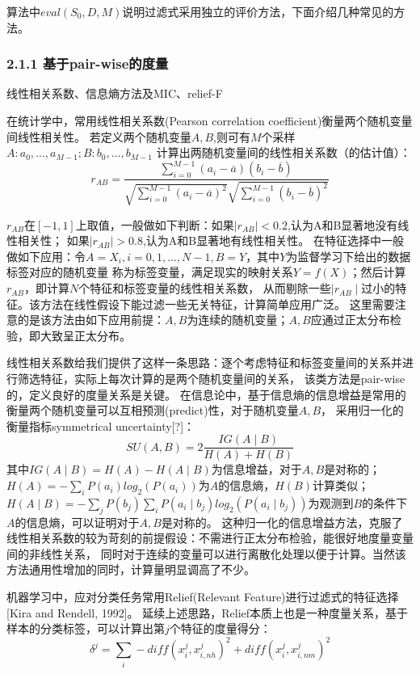 \documentclass[a4paper,UTF8]{article}
\begin{document}
  算法中$ eval(S_{0}, D, M)$说明过滤式采用独立的评价方法，下面介绍几种常见的方法。

\subsubsection*{2.1.1 基于pair-wise的度量}
  线性相关系数、信息熵方法及MIC、relief-F

  在统计学中，常用线性相关系数(Pearson correlation coefficient)衡量两个随机变量间线性相关性。
  若定义两个随机变量$ A, B $,则可有$M$个采样$ A: a_{0},...,a_{M-1}; B: b_{0},...,b_{M-1}$
  计算出两随机变量间的线性相关系数（的估计值）：
  $$  r_{AB} = \frac{\sum_{i=0}^{M-1}(a_{i}-\overline{a})(b_{i}-\overline{b})}
  {\sqrt{\sum_{i=0}^{M-1}(a_{i}-\overline{a})^2}\sqrt{\sum_{i=0}^{M-1}(b_{i}-\overline{b})^2}}$$

  $ r_{AB} $在$ [-1,1]$上取值，一般做如下判断：如果$ \mid{r_{AB}}\mid<0.2$,认为A和B显著地没有线性相关性；
  如果$ \mid{r_{AB}}\mid>0.8$,认为A和B显著地有线性相关性。
  在特征选择中一般做如下应用：令$ A=X_{i},i=0,1,...,N-1, B=Y$，其中$Y$为监督学习下给出的数据标签对应的随机变量
  称为标签变量，满足现实的映射关系$Y=f(X)$；然后计算$ r_{AB} $，即计算$N$个特征和标签变量的线性相关系数，
  从而剔除一些$\mid{r_{AB}}\mid$过小的特征。该方法在线性假设下能过滤一些无关特征，计算简单应用广泛。
  这里需要注意的是该方法由如下应用前提：$A,B$为连续的随机变量；$A,B$应通过正太分布检验，即大致呈正太分布。

  线性相关系数给我们提供了这样一条思路：逐个考虑特征和标签变量间的关系并进行筛选特征，实际上每次计算的是两个随机变量间的关系，
  该类方法是pair-wise的，定义良好的度量关系是关键。
  在信息论中，基于信息熵的信息增益是常用的衡量两个随机变量可以互相预测(predict)性，对于随机变量$ A, B $，
  采用归一化的衡量指标symmetrical uncertainty[?]：
  $$ SU(A, B) = 2 \frac{IG(A \mid B)}{H(A)+H(B)} $$
  其中$IG(A \mid B)=H(A)-H(A \mid B)$为信息增益，对于$A,B$是对称的；
  $H(A)=-\sum_{i}P(a_{i})log_{2}(P(a_{i}))$为$A$的信息熵，$H(B)$计算类似；
  $H(A \mid B)=-\sum_{j}P(b_{j})\sum_{i}P(a_{i} \mid b_{j})log_{2}(P(a_{i} \mid b_{j}))$为观测到$B$的条件下
  $A$的信息熵，可以证明对于$A,B$是对称的。
  这种归一化的信息增益方法，克服了线性相关系数的较为苛刻的前提假设：不需进行正太分布检验，能很好地度量变量间的非线性关系，
  同时对于连续的变量可以进行离散化处理以便于计算。当然该方法通用性增加的同时，计算量明显调高了不少。

  机器学习中，应对分类任务常用Relief(Relevant Feature)进行过滤式的特征选择[Kira and Rendell, 1992]。
  延续上述思路，Relief本质上也是一种度量关系，基于样本的分类标签，可以计算出第$j$个特征的度量得分：
  $$ \delta^{j}=\sum_{i}-diff(x_{i}^{j},x_{i,nh}^{j})^{2}+diff(x_{i}^{j},x_{i,nm}^{j})^{2} $$
\end{document}
